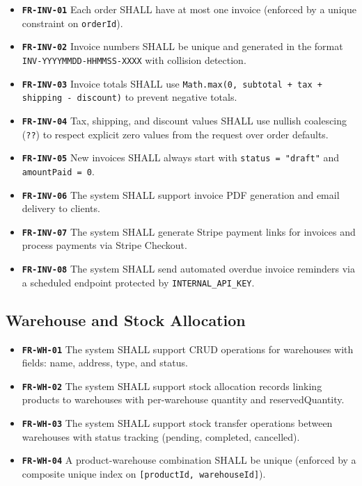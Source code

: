 ﻿\documentclass[12pt,a4paper]{report}
\newcommand{\req}[1]{\texttt{\textbf{\color{primary}#1}}}
\begin{document}
\begin{tcolorbox}[reqbox,title={FR-INV: Invoice Requirements}]
\begin{itemize}[leftmargin=1.5em]
  \item \req{FR-INV-01} Each order SHALL have at most one invoice (enforced by a unique constraint on \texttt{orderId}).
  \item \req{FR-INV-02} Invoice numbers SHALL be unique and generated in the format \texttt{INV-YYYYMMDD-HHMMSS-XXXX} with collision detection.
  \item \req{FR-INV-03} Invoice totals SHALL use \texttt{Math.max(0, subtotal + tax + shipping - discount)} to prevent negative totals.
  \item \req{FR-INV-04} Tax, shipping, and discount values SHALL use nullish coalescing (\texttt{??}) to respect explicit zero values from the request over order defaults.
  \item \req{FR-INV-05} New invoices SHALL always start with \texttt{status = "draft"} and \texttt{amountPaid = 0}.
  \item \req{FR-INV-06} The system SHALL support invoice PDF generation and email delivery to clients.
  \item \req{FR-INV-07} The system SHALL generate Stripe payment links for invoices and process payments via Stripe Checkout.
  \item \req{FR-INV-08} The system SHALL send automated overdue invoice reminders via a scheduled endpoint protected by \texttt{INTERNAL\_API\_KEY}.
\end{itemize}
\end{tcolorbox}

\subsection{Warehouse and Stock Allocation}

\begin{tcolorbox}[reqbox,title={FR-WH: Warehouse Requirements}]
\begin{itemize}[leftmargin=1.5em]
  \item \req{FR-WH-01} The system SHALL support CRUD operations for warehouses with fields: name, address, type, and status.
  \item \req{FR-WH-02} The system SHALL support stock allocation records linking products to warehouses with per-warehouse quantity and reservedQuantity.
  \item \req{FR-WH-03} The system SHALL support stock transfer operations between warehouses with status tracking (pending, completed, cancelled).
  \item \req{FR-WH-04} A product-warehouse combination SHALL be unique (enforced by a composite unique index on \texttt{[productId, warehouseId]}).
\end{itemize}
\end{tcolorbox}
\end{document}
